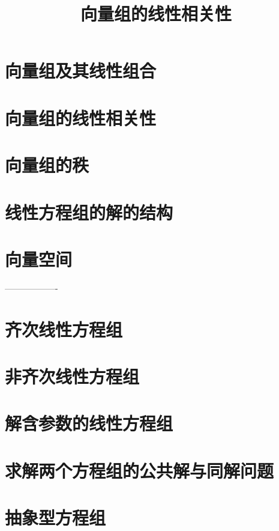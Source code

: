 \documentclass[UTF8]{ctexart}
\title{向量组的线性相关性}
\begin{document}
	\tableofcontents %
	\date{} %
	\maketitle  %
	
	\section{向量组及其线性组合}
	
	\section{向量组的线性相关性}
	
	\section{向量组的秩}
	
	
	\section{线性方程组的解的结构}
	
	
	\section{向量空间}
	
	-------------------
	
	
	
	\section{齐次线性方程组}
	
	
	
	
	
	\section{非齐次线性方程组}
	
	
	
	
	\section{解含参数的线性方程组}
	
	
	\section{求解两个方程组的公共解与同解问题}
	

	
	\section{抽象型方程组}
	
	
	
	
\end{document}
